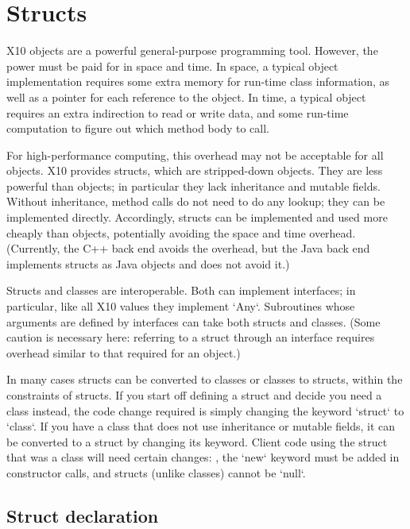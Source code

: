 \chapter{Structs}
\label{XtenStructs}
\label{StructClasses}
\label{Structs}

X10 objects are a powerful general-purpose programming tool. However, the
power must be paid for in space and time. In space, a typical object
implementation requires some extra memory for run-time class information, as
well as a pointer for each reference to the object. In time, a typical object
requires an extra indirection to read or write data, and some run-time
computation to figure out which method body to call.

For high-performance computing, this overhead may not be acceptable for all
objects. X10 provides structs, which are stripped-down objects. They are less
powerful than objects; in particular they lack inheritance and mutable fields.
Without inheritance, method calls do not need to do any lookup; they can be
implemented directly. Accordingly, structs can be implemented and used more
cheaply than objects, potentially avoiding the space and time overhead.
(Currently, the C++ back end avoids the overhead, but the Java back end
implements structs as Java objects and does not avoid it.)

Structs and classes are interoperable. Both can implement interfaces; in
particular, like all X10 values they implement \xcd`Any`.  Subroutines 
whose arguments are defined by interfaces can take both structs and classes.
(Some caution is necessary here: referring to a struct through an interface
requires overhead similar to that required for an object.)

In many cases structs can be converted to classes or classes to structs,
within the constraints of structs. If you start off defining a struct and
decide you need a class instead, the code change required is simply changing
the keyword \xcd`struct` to \xcd`class`. If you have a class that does not use
inheritance or mutable fields, it can be converted to a struct by changing its
keyword. Client code using the struct that was a class will need certain
changes: \eg, the \xcd`new` keyword must be added in constructor calls, and
structs (unlike classes) cannot be \xcd`null`.  



\section{Struct declaration}

